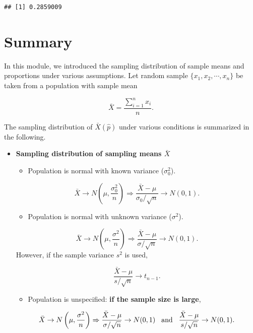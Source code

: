 \documentclass[
]{book}
\providecommand{\tightlist}{%
  \setlength{\itemsep}{0pt}\setlength{\parskip}{0pt}}
\begin{document}
\begin{verbatim}
## [1] 0.2859009
\end{verbatim}

\hypertarget{summary-1}{%
\section{Summary}\label{summary-1}}

In this module, we introduced the sampling distribution of sample means and proportions under various assumptions. Let random sample \(\{x_1, x_2, \cdots, x_n \}\) be taken from a population with sample mean

\[
\bar{X} = \frac{\sum_{i=1}^n x_i}{n}.
\]

The sampling distribution of \(\bar{X} (\hat{p})\) under various conditions is summarized in the following.

\begin{itemize}
\item
  \textbf{Sampling distribution of sampling means \(\bar{X}\)}

  \begin{itemize}
  \tightlist
  \item
    Population is normal with known variance (\(\sigma_0^2\)).
  \end{itemize}

  \[
  \bar{X} \to N\left( \mu, \frac{\sigma_0^2}{n} \right) \Rightarrow \frac{\bar{X}-\mu}{\sigma_0/\sqrt{n}} \to N(0,1).
  \]

  \begin{itemize}
  \tightlist
  \item
    Population is normal with unknown variance (\(\sigma^2\)).
  \end{itemize}

  \[
   \bar{X} \to N\left( \mu, \frac{\sigma^2}{n} \right) \Rightarrow \frac{\bar{X}-\mu}{\sigma/\sqrt{n}} \to N(0,1).
  \]
  However, if the sample variance \(s^2\) is used,

  \[
  \frac{\bar{X}-\mu}{s/\sqrt{n}} \to t_{n-1}.
  \]

  \begin{itemize}
  \tightlist
  \item
    Population is unspecified: \textbf{if the sample size is large},
  \end{itemize}

  \[
   \bar{X} \to N\left( \mu, \frac{\sigma^2}{n} \right) \Rightarrow \frac{\bar{X}-\mu}{\sigma/\sqrt{n}} \to N(0,1) \hspace{3mm} \mbox{and} \hspace{3mm} \frac{\bar{X}-\mu}{s/\sqrt{n}} \to N(0,1).
  \]
\end{itemize}
\end{document}
